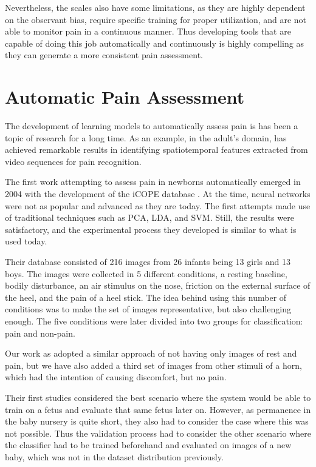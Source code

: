 Nevertheless, the scales also have some limitations, as they are highly dependent on the observant bias, require specific training for proper utilization, and are not able to monitor pain in a continuous manner. Thus developing tools that are capable of doing this job automatically and continuously is highly compelling as they can generate a more consistent pain assessment.

\section{Automatic Pain Assessment}

The development of learning models to automatically assess pain is has been a topic of research for a long time. As an example, in the adult's domain, \citep{MauricioCVC19} has achieved remarkable results in identifying spatiotemporal features extracted from video sequences for pain recognition.

The first work attempting to assess pain in newborns automatically emerged in 2004 with the development of the iCOPE database \citep{Brahnam2006}. At the time, neural networks were not as popular and advanced as they are today. The first attempts made use of traditional techniques such as PCA, LDA, and SVM. Still, the results were satisfactory, and the experimental process they developed is similar to what is used today. 

Their database consisted of 216 images from 26 infants being 13 girls and 13 boys. The images were collected in 5 different conditions, a resting baseline, bodily disturbance, an air stimulus on the nose, friction on the external surface of the heel, and the pain of a heel stick. The idea behind using this number of conditions was to make the set of images representative, but also challenging enough. The five conditions were later divided into two groups for classification: pain and non-pain.

Our work as adopted a similar approach of not having only images of rest and pain, but we have also added a third set of images from other stimuli of a horn, which had the intention of causing discomfort, but no pain. 

Their first studies considered the best scenario where the system would be able to train on a fetus and evaluate that same fetus later on. However, as permanence in the baby nursery is quite short, they also had to consider the case where this was not possible. Thus the validation process had to consider the other scenario where the classifier had to be trained beforehand and evaluated on images of a new baby, which was not in the dataset distribution previously.

